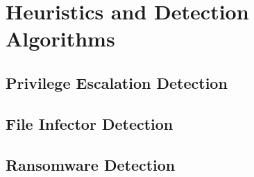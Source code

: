 \chapter{Heuristics and Detection Algorithms}
    \section{Privilege Escalation Detection}
    \section{File Infector Detection}
    \section{Ransomware Detection}
